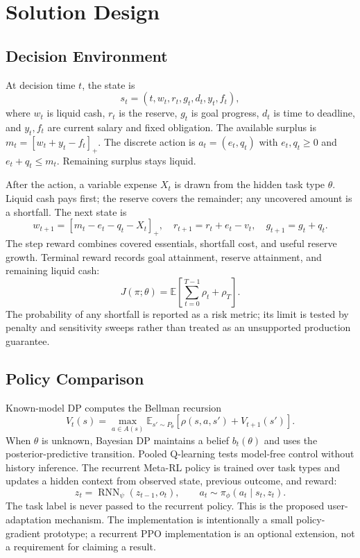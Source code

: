 \section{Solution Design}\label{sec:solution_design}

\subsection{Decision Environment}
At decision time $t$, the state is
\[
s_t=(t,w_t,r_t,g_t,d_t,y_t,f_t),
\]
where $w_t$ is liquid cash, $r_t$ is the reserve, $g_t$ is goal progress, $d_t$ is time to deadline, and $y_t,f_t$ are current salary and fixed obligation. The available surplus is $m_t=[w_t+y_t-f_t]_+$. The discrete action is $a_t=(e_t,q_t)$ with $e_t,q_t\geq0$ and $e_t+q_t\leq m_t$. Remaining surplus stays liquid.

After the action, a variable expense $X_t$ is drawn from the hidden task type $\theta$. Liquid cash pays first; the reserve covers the remainder; any uncovered amount is a shortfall. The next state is
\[
w_{t+1}=[m_t-e_t-q_t-X_t]_+,\quad
r_{t+1}=r_t+e_t-v_t,\quad
g_{t+1}=g_t+q_t.
\]
The step reward combines covered essentials, shortfall cost, and useful reserve growth. Terminal reward records goal attainment, reserve attainment, and remaining liquid cash:
\[
J(\pi;\theta)=\mathbb{E}\left[\sum_{t=0}^{T-1}\rho_t+\rho_T\right].
\]
The probability of any shortfall is reported as a risk metric; its limit is tested by penalty and sensitivity sweeps rather than treated as an unsupported production guarantee.

\subsection{Policy Comparison}
Known-model DP computes the Bellman recursion
\[
V_t(s)=\max_{a\in A(s)}\mathbb{E}_{s'\sim P_\theta}[\rho(s,a,s')+V_{t+1}(s')].
\]
When $\theta$ is unknown, Bayesian DP maintains a belief $b_t(\theta)$ and uses the posterior-predictive transition. Pooled Q-learning tests model-free control without history inference. The recurrent Meta-RL policy is trained over task types and updates a hidden context from observed state, previous outcome, and reward:
\[
z_t=\operatorname{RNN}_\psi(z_{t-1},o_t),\qquad
a_t\sim\pi_\phi(a_t\mid s_t,z_t).
\]
The task label is never passed to the recurrent policy. This is the proposed user-adaptation mechanism. The implementation is intentionally a small policy-gradient prototype; a recurrent PPO implementation is an optional extension, not a requirement for claiming a result.

